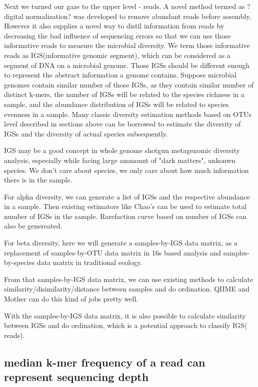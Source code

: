 Next we turned our gaze to the upper level - reads. A novel method termed as ?digital normalization? was developed to remove abundant reads before assembly. However it also supplies a novel way to distil information from reads by decreasing the bad influence of sequencing errors so that we can use those informative reads to measure the microbial diversity. We term those informative reads as IGS(informative genomic segment), which can be considered as a segment of DNA on a microbial genome. Those IGSs should be different enough to represent the abstract information a genome contains. Suppose microbial genomes contain similar number of those IGSs, as they contain similar number of distinct k-mers, the number of IGSs will be related to the species richness in a sample, and the abundance distribution of IGSs will be related to species evenness in a sample. Many classic diversity estimation methods based on OTUs level described in sections above can be borrowed to estimate the diversity of IGSs and the diversity of actual species subsequently.

IGS may be a good concept in whole genome shotgun metagenomic diversity analysis, especially while facing large ammount of "dark matters", unkonwn species. We don't care about species, we only care about how much information there is in the sample.


For alpha diversity, we can generate a list of IGSs and the respective abundance in a sample. Then existing estimators like Chao's can be used to estimate total number of IGSs in the sample. Rarefaction curve based on number of IGSs can also be genereated. 

For beta diversity, here we will generate a samples-by-IGS data matrix, as a replacement of samples-by-OTU data matrix in 16s based analysis and samples-by-species data matrix in traditional ecology. 


From that samples-by-IGS data matrix, we can use existing methods to calculate similarity/disimilarity/distance between samples and do ordination. QIIME and Mother can do this kind of jobs pretty well.

With the samples-by-IGS data matrix, it is also possible to calculate similarity between IGSs and do ordination, which is a potential approach to classify IGS( reads).


\subsection{median k-mer frequency of a read can represent sequencing depth}

